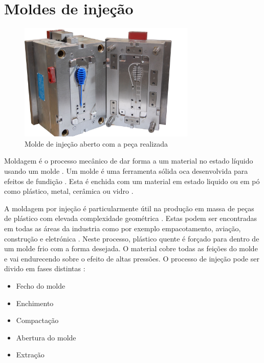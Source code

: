 \documentclass[11pt,twoside,a4paper]{report}
\begin{document}
\section{Moldes de injeção}
\begin{figure}[H]
	\begin{center}
		\includegraphics[width=0.75\textwidth]{molde} %
		\caption[Molde de injeção]{Molde de injeção aberto com a peça realizada \cite{molde_imagem}}
		\label{fig:molde}
	\end{center}
\end{figure}
Moldagem é o processo mecânico de dar forma a um material no estado líquido usando um molde \cite{definicao_moldagem,definicao_moldar}. Um molde é uma ferramenta sólida oca desenvolvida para efeitos de fundição \cite{definicao_molde}. Esta é enchida com um material em estado liquido ou em pó como plástico, metal, cerâmica ou vidro \cite{Williams1975,Trovant1998,JanneyMarkA.Knoxville1991,Yan2009}.\par
A moldagem por injeção é particularmente útil na produção em massa de peças de plástico com elevada complexidade geométrica \cite{Shen,Shelesh}. Estas podem ser encontradas em todas as áreas da industria como por exemplo empacotamento, aviação, construção e eletrónica \cite{Ozcelik}. Neste processo, plástico quente é forçado para dentro de um molde frio com a forma desejada. O material cobre todas as feições do molde e vai endurecendo sobre o efeito de altas pressões. O processo de injeção pode ser divido em fases distintas \cite{Shen}:
\begin{itemize}[noitemsep]
	\item Fecho do molde
	\item Enchimento
	\item Compactação
	\item Abertura do molde
	\item Extração
\end{itemize}
\end{document}
